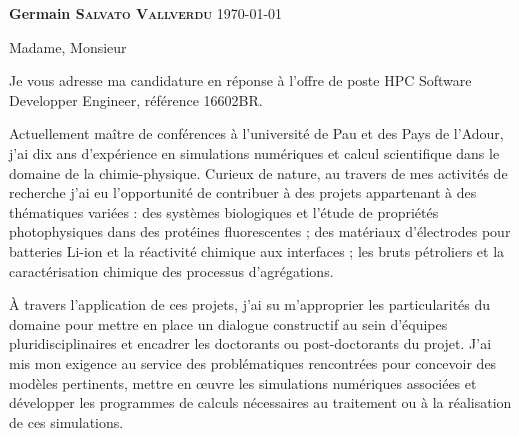 \documentclass[11pt,a4paper,ragged2e,academicons]{alta_letter}
\begin{document}
\name{}
\tagline{}


{\color{emphasis}\Large\bfseries Germain \textsc{Salvato Vallverdu}}
\hfill\today\par

\parbox{.5\textwidth}{\makecvheader}

\justify

\cvsection{~}

\setlength{\parindent}{0pt}
\setlength{\parskip}{1.5ex plus 0.5ex minus 0.5ex}

\bigskip

Madame, Monsieur

\medskip

Je vous adresse ma candidature en réponse à l'offre de poste HPC Software Developper Engineer, référence 16602BR.

Actuellement maître de conférences à l'université de Pau et des Pays de l'Adour, j'ai dix ans d'expérience en simulations numériques et calcul scientifique dans le domaine de la chimie-physique. Curieux de nature, au travers de mes activités de recherche j'ai eu l'opportunité de contribuer à des projets appartenant à des thématiques variées : des systèmes biologiques et l'étude de propriétés photophysiques dans des protéines fluorescentes ; des matériaux d'électrodes pour batteries Li-ion et la réactivité chimique aux interfaces ; les bruts pétroliers et la caractérisation chimique des processus d'agrégations.

À travers l'application de ces projets, j'ai su m'approprier les particularités du domaine pour mettre en place un dialogue constructif au sein d'équipes pluridisciplinaires et encadrer les doctorants ou post-doctorants du projet. J'ai mis mon exigence au service des problématiques rencontrées pour concevoir des modèles pertinents, mettre en œuvre les simulations numériques associées et développer les programmes de calculs nécessaires au traitement ou à la réalisation de ces simulations.
\end{document}
